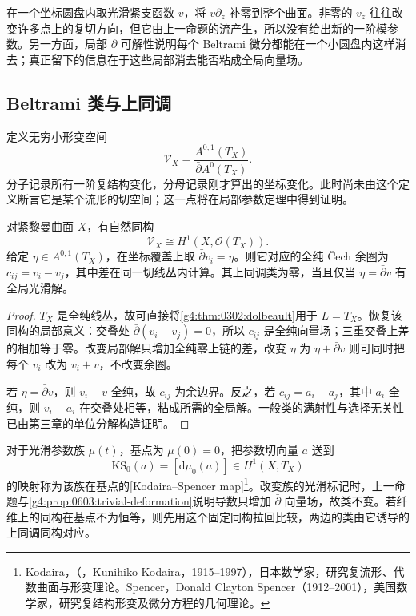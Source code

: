 \begin{example}\label{g4:exm:0603:local-triviality}
	在一个坐标圆盘内取光滑紧支函数 \(v\)，将 \(v\partial_z\) 补零到整个曲面。非零的 \(v_{\overline z}\) 往往改变许多点上的复切方向，但它由上一命题的流产生，所以没有给出新的一阶模参数。另一方面，局部 \(\bar\partial\) 可解性说明每个 Beltrami 微分都能在一个小圆盘内这样消去；真正留下的信息在于这些局部消去能否粘成全局向量场。
\end{example}

\subsection{Beltrami 类与上同调}
\label{g4:subsec:0603:02}

定义无穷小形变空间
\begin{equation}\label{g4:eq:0603:infinitesimal-quotient}
	\mathcal V_X
	=\frac{A^{0,1}(T_X)}{\bar\partial A^0(T_X)}.
\end{equation}
分子记录所有一阶复结构变化，分母记录刚才算出的坐标变化。此时尚未由这个定义断言它是某个流形的切空间；这一点将在局部参数定理中得到证明。

\begin{proposition}\label{g4:prop:0603:dolbeault-class}
	对紧黎曼曲面 \(X\)，有自然同构
	\[
		\mathcal V_X\cong H^1(X,\mathcal O(T_X)).
	\]
	给定 \(\eta\in A^{0,1}(T_X)\)，在坐标覆盖上取 \(\bar\partial v_i=\eta\)。则它对应的全纯 Čech 余圈为 \(c_{ij}=v_i-v_j\)，其中差在同一切线丛内计算。其上同调类为零，当且仅当 \(\eta=\bar\partial v\) 有全局光滑解。
\end{proposition}
\begin{proof}
	\(T_X\) 是全纯线丛，故可直接将\cref{g4:thm:0302:dolbeault}用于 \(L=T_X\)。恢复该同构的局部意义：交叠处 \(\bar\partial(v_i-v_j)=0\)，所以 \(c_{ij}\) 是全纯向量场；三重交叠上差的相加等于零。改变局部解只增加全纯零上链的差，改变 \(\eta\) 为 \(\eta+\bar\partial v\) 则可同时把每个 \(v_i\) 改为 \(v_i+v\)，不改变余圈。

	若 \(\eta=\bar\partial v\)，则 \(v_i-v\) 全纯，故 \(c_{ij}\) 为余边界。反之，若 \(c_{ij}=a_i-a_j\)，其中 \(a_i\) 全纯，则 \(v_i-a_i\) 在交叠处相等，粘成所需的全局解。一般类的满射性与选择无关性已由第三章的单位分解构造证明。
\end{proof}

对于光滑参数族 \(\mu(t)\)，基点为 \(\mu(0)=0\)，把参数切向量 \(a\) 送到
\[
	\mathrm{KS}_0(a)=[\mathrm{d}\mu_0(a)]\in H^1(X,T_X)
\]
的映射称为该族在基点的[Kodaira--Spencer map]\footnote{Kodaira，（，Kunihiko Kodaira，1915--1997），日本数学家，研究复流形、代数曲面与形变理论。Spencer，Donald Clayton Spencer（1912--2001），美国数学家，研究复结构形变及微分方程的几何理论。}。改变族的光滑标记时，上一命题与\cref{g4:prop:0603:trivial-deformation}说明导数只增加 \(\bar\partial\) 向量场，故类不变。若纤维上的同构在基点不为恒等，则先用这个固定同构拉回比较，两边的类由它诱导的上同调同构对应。

